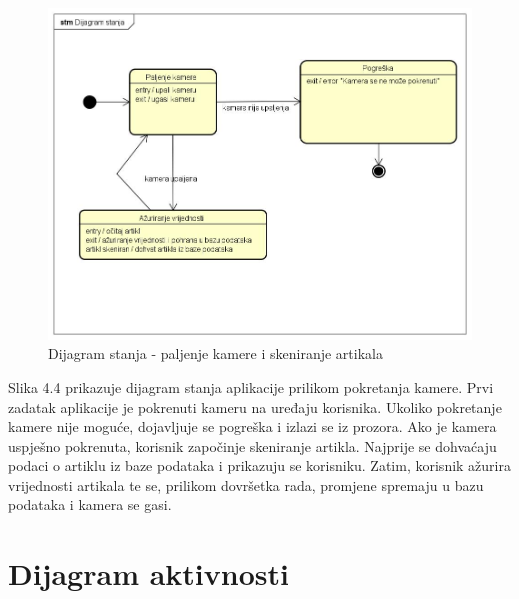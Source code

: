 			\begin{figure}[H]
				\centering
				\includegraphics[width=1.0\linewidth]{"slike/Dijagram stanja"}
				\caption{Dijagram stanja - paljenje kamere i skeniranje artikala}
				\label{Slika 4.4}
			\end{figure}
		
			Slika 4.4 prikazuje dijagram stanja aplikacije prilikom pokretanja kamere. Prvi zadatak aplikacije je pokrenuti kameru na uređaju korisnika. Ukoliko pokretanje kamere nije moguće, dojavljuje se pogreška i izlazi se iz prozora. Ako je kamera uspješno pokrenuta, korisnik započinje skeniranje artikla. Najprije se dohvaćaju podaci o artiklu iz baze podataka i prikazuju se korisniku. Zatim, korisnik ažurira vrijednosti artikala te se, prilikom dovršetka rada, promjene spremaju u bazu podataka i kamera se gasi.
			
			\eject 
		
		
		\section{Dijagram aktivnosti}
			

		
